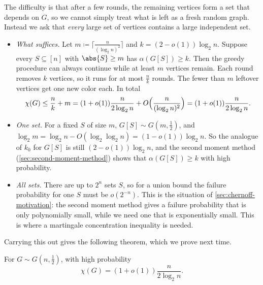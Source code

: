 The difficulty is that after a few rounds, the remaining vertices form a set that depends on \(G\), so we cannot simply treat what is left as a fresh random graph. Instead we ask that \emph{every} large set of vertices contains a large independent set.
\begin{itemize}
    \item \emph{What suffices.} Let \(m \coloneqq \bigl\lceil \frac{n}{(\log_{2} n)^{2}} \bigr\rceil\) and \(k = (2 - o(1)) \log_{2} n\). Suppose every \(S \subseteq [n]\) with \(\abs{S} \ge m\) has \(\alpha(G[S]) \ge k\). Then the greedy procedure can always continue while at least \(m\) vertices remain. Each round removes \(k\) vertices, so it runs for at most \(\frac{n}{k}\) rounds. The fewer than \(m\) leftover vertices get one new color each. In total
    \[
        \chi(G) \le \frac{n}{k} + m = (1 + o(1)) \frac{n}{2 \log_{2} n} + O\Bigl( \frac{n}{(\log_{2} n)^{2}} \Bigr) = (1 + o(1)) \frac{n}{2 \log_{2} n} .
    \]
    \item \emph{One set.} For a fixed \(S\) of size \(m\), \(G[S] \sim G(m, \frac{1}{2})\), and \(\log_{2} m = \log_{2} n - O(\log_{2} \log_{2} n) = (1 - o(1)) \log_{2} n\). So the analogue of \(k_{0}\) for \(G[S]\) is still \((2 - o(1)) \log_{2} n\), and the second moment method (\autoref{sec:second-moment-method}) shows that \(\alpha(G[S]) \ge k\) with high probability.
    \item \emph{All sets.} There are up to \(2^{n}\) sets \(S\), so for a union bound the failure probability for one \(S\) must be \(o(2^{-n})\). This is the situation of \autoref{sec:chernoff-motivation}: the second moment method gives a failure probability that is only polynomially small, while we need one that is exponentially small. This is where a martingale concentration inequality is needed.
\end{itemize}
Carrying this out gives the following theorem, which we prove next time.

\begin{theorem}[Bollob\'as, 1988]\label{thm:bollobas-chi}
    For \(G \sim G(n, \frac{1}{2})\), with high probability
    \[
        \chi(G) = (1 + o(1)) \frac{n}{2 \log_{2} n} .
    \]
\end{theorem}
